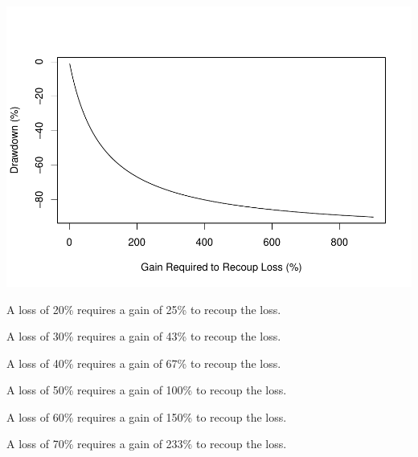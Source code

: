 \documentclass[]{article}
\begin{document}
\includegraphics{diversificationInTheManagedFuturesUniverse_files/figure-latex/unnamed-chunk-56-1.pdf}

A loss of 20\% requires a gain of 25\% to recoup the loss.

A loss of 30\% requires a gain of 43\% to recoup the loss.

A loss of 40\% requires a gain of 67\% to recoup the loss.

A loss of 50\% requires a gain of 100\% to recoup the loss.

A loss of 60\% requires a gain of 150\% to recoup the loss.

A loss of 70\% requires a gain of 233\% to recoup the loss.
\end{document}
